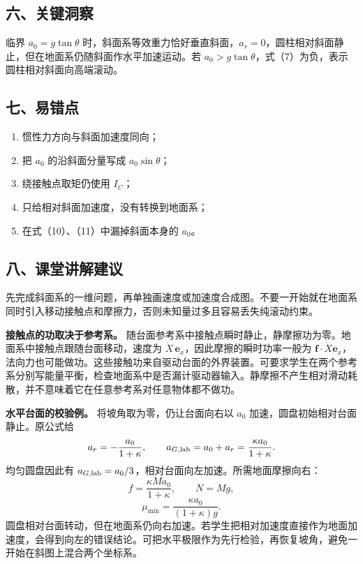 \documentclass[12pt,a4paper,UTF8]{ctexart}
\newcommand{\tightlist}{\setlength{\itemsep}{0pt}\setlength{\parskip}{0pt}}
\begin{document}
\subsection{六、关键洞察}\label{ux516dux5173ux952eux6d1eux5bdf-1}

临界 \(a_0=g\tan\theta\)
时，斜面系等效重力恰好垂直斜面，\(a_r=0\)，圆柱相对斜面静止，但在地面系仍随斜面作水平加速运动。若
\(a_0>g\tan\theta\)，式（7）为负，表示圆柱相对斜面向高端滚动。

\subsection{七、易错点}\label{ux4e03ux6613ux9519ux70b9-1}

\begin{enumerate}
\def\labelenumi{\arabic{enumi}.}
\tightlist
\item
  惯性力方向与斜面加速度同向；
\item
  把 \(a_0\) 的沿斜面分量写成 \(a_0\sin\theta\)；
\item
  绕接触点取矩仍使用 \(I_C\)；
\item
  只给相对斜面加速度，没有转换到地面系；
\item
  在式（10）、（11）中漏掉斜面本身的 \(a_0\)。
\end{enumerate}

\subsection{八、课堂讲解建议}\label{ux516bux8bfeux5802ux8bb2ux89e3ux5efaux8bae-1}

先完成斜面系的一维问题，再单独画速度或加速度合成图。不要一开始就在地面系同时引入移动接触点和摩擦力，否则未知量过多且容易丢失纯滚动约束。

\textbf{接触点的功取决于参考系。}
随台面参考系中接触点瞬时静止，静摩擦功为零。地面系中接触点跟随台面移动，速度为
\(\dot X\,\boldsymbol e_x\)，因此摩擦的瞬时功率一般为
\(\boldsymbol f\cdot\dot X\boldsymbol e_x\)，法向力也可能做功。这些接触功来自驱动台面的外界装置。可要求学生在两个参考系分别写能量平衡，检查地面系中是否漏计驱动器输入。静摩擦不产生相对滑动耗散，并不意味着它在任意参考系对任意物体都不做功。

\textbf{水平台面的校验例。} 将坡角取为零，仍让台面向右以 \(a_0\)
加速，圆盘初始相对台面静止。原公式给 \[
a_r=-\frac{a_0}{1+\kappa},\qquad
a_{G,\rm lab}=a_0+a_r=\frac{\kappa a_0}{1+\kappa}.
\] 均匀圆盘因此有
\(a_{G,\rm lab}=a_0/3\)，相对台面向左加速。所需地面摩擦向右： \[
f=\frac{\kappa Ma_0}{1+\kappa},\qquad N=Mg,
\] \[
\mu_{\min}=\frac{\kappa a_0}{(1+\kappa)g}.
\]
圆盘相对台面转动，但在地面系仍向右加速。若学生把相对加速度直接作为地面加速度，会得到向左的错误结论。可把水平极限作为先行检验，再恢复坡角，避免一开始在斜图上混合两个坐标系。
\end{document}
